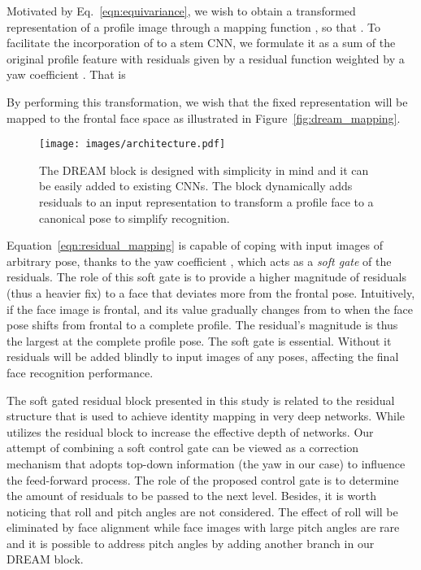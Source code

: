 \documentclass[10pt,twocolumn,letterpaper]{article}
\begin{document}
Motivated by Eq.~\eqref{eqn:equivariance}, we wish to obtain a transformed representation of a profile image  through a mapping function , so that .  
To facilitate the incorporation of  to a stem CNN, we formulate it as a sum of the original profile feature  with residuals given by a residual function  weighted by a yaw coefficient . That is

By performing this transformation, we wish that the fixed representation  will be mapped to the frontal face space as illustrated in Figure~\ref{fig:dream_mapping}.



\begin{figure}[t]
\begin{center}
   \texttt{[image: images/architecture.pdf]}
\end{center}
\vskip -0.4cm
   \caption{The DREAM block is designed with simplicity in mind and it can be easily added to existing CNNs. The block dynamically adds residuals to an input representation to transform a profile face to a canonical pose to simplify recognition.}
\label{fig:architecture}
\vskip -0.2cm
\end{figure}

Equation~\eqref{eqn:residual_mapping} is capable of coping with input images of arbitrary pose, thanks to the yaw coefficient , which acts as a \textit{soft gate} of the residuals. 
The role of this soft gate is to provide a higher magnitude of residuals (thus a heavier fix) to a face that deviates more from the frontal pose.
Intuitively,  if the face image is frontal, and its value gradually changes from  to  when the face pose shifts from frontal to a complete profile. The residual's magnitude is thus the largest at the complete profile pose. 
The soft gate is essential. Without it residuals  will be added blindly to input images of any poses, affecting the final face recognition performance. 


The soft gated residual block presented in this study is related to the residual structure \cite{he2016deep} that is used to achieve identity mapping in very deep networks.
While \cite{he2016deep} utilizes the residual block to increase the effective depth of networks. Our attempt of combining a soft control gate can be viewed as a correction mechanism that adopts top-down information (the yaw in our case) to influence the feed-forward process. The role of the proposed control gate is to determine the amount of residuals to be passed to the next level.  Besides, it is worth noticing that roll and pitch angles are not considered. The effect of roll will be eliminated by face alignment while face images with large pitch angles are rare and it is possible to address pitch angles by adding another branch in our DREAM block.
\end{document}
